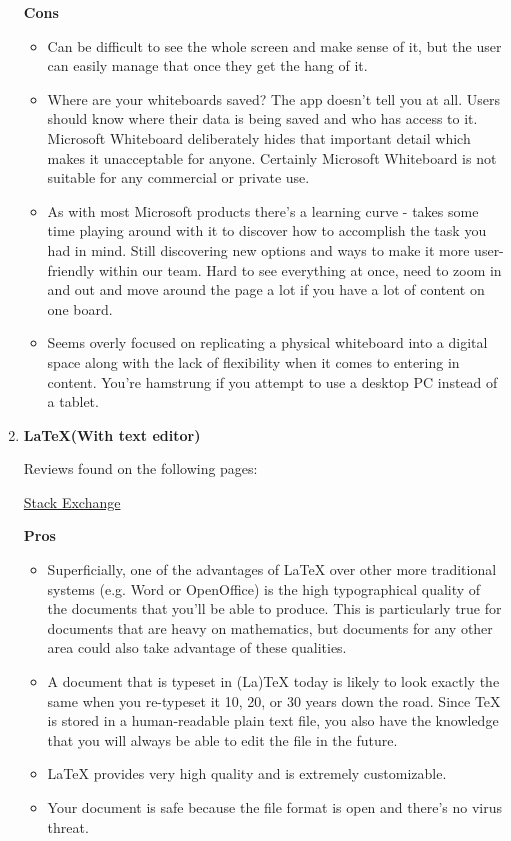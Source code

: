 \documentclass[a4paper,12pt]{article}
\begin{document}
\begin{enumerate}
  \textbf{Cons}
  \begin{itemize}
  \item Can be difficult to see the whole screen and make sense of it, but the user can easily manage that once they get the hang of it.
  \item Where are your whiteboards saved?  The app doesn’t tell you at all. Users should know where their data is being saved and who has access to it.  Microsoft Whiteboard deliberately hides that important detail which makes it unacceptable for anyone.  Certainly Microsoft Whiteboard is not suitable for any commercial or private use.
  \item As with most Microsoft products there's a learning curve - takes some time playing around with it to discover how to accomplish the task you had in mind. Still discovering new options and ways to make it more user-friendly within our team. Hard to see everything at once, need to zoom in and out and move around the page a lot if you have a lot of content on one board.
  \item Seems overly focused on replicating a physical whiteboard into a digital space along with the lack of flexibility when it comes to entering in content. You're hamstrung if you attempt to use a desktop PC instead of a tablet.
  \end{itemize}

\item \textbf{\LaTeX (With text editor)}
  
  \vspace{0.1cm}
  Reviews found on the following pages:
  \begin{center}
    \href{https://tex.stackexchange.com/questions/1756/why-should-i-use-latex}{Stack Exchange}\\
  \end{center}
  
  \textbf{Pros}
  \begin{itemize}
  \item Superficially, one of the advantages of LaTeX over other more traditional systems (e.g. Word or OpenOffice) is the high typographical quality of the documents that you'll be able to produce. This is particularly true for documents that are heavy on mathematics, but documents for any other area could also take advantage of these qualities.
  \item A document that is typeset in (La)TeX today is likely to look exactly the same when you re-typeset it 10, 20, or 30 years down the road. Since TeX is stored in a human-readable plain text file, you also have the knowledge that you will always be able to edit the file in the future.
  \item LaTeX provides very high quality and is extremely customizable.
  \item Your document is safe because the file format is open and there's no virus threat.
  \end{itemize}
  

\end{enumerate}
\end{document}
